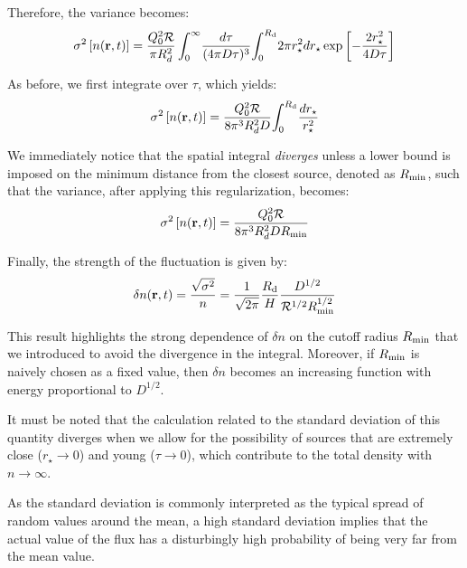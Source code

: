Therefore, the variance becomes:
%
\begin{equation}
\sigma^2 \left[ n(\vb r, t) \right] =
\frac{Q_0^2 \mathcal{R}}{\pi R_d^2} 
\int_0^{\infty} \! \frac{d\tau}{(4\pi D \tau)^{3}} \! \int_0^{R_{\rm d}} \! 2 \pi r_\star^2 dr_\star 
\exp \left[ -\frac{2  r_\star^2}{4 D \tau} \right] 
\end{equation}

As before, we first integrate over $\tau$, which yields:
%
\begin{equation}
\sigma^2 \left[ n(\vb r, t) \right] =
\frac{Q_0^2 \mathcal{R}}{8 \pi^3 R_d^2 D} 
\! \int_0^{R_{\rm d}} \! \frac{dr_\star}{r_\star^2}
\end{equation}

We immediately notice that the spatial integral \emph{diverges} unless a lower bound is imposed on the minimum distance from the closest source, denoted as $R_{\rm min}$, such that the variance, after applying this regularization, becomes:
%
\begin{equation}
\sigma^2 \left[ n(\vb r, t) \right] =
\frac{Q_0^2 \mathcal{R}}{8 \pi^3 R_d^2 D R_{\rm min}} 
\end{equation}

Finally, the strength of the fluctuation is given by:
%
\begin{equation}
\delta n (\vb r, t)  = \frac{\sqrt{\sigma^2}}{n} = \frac{1}{\sqrt{2\pi}} \frac{R_{\rm d}}{H} \frac{D^{1/2}}{\mathcal R^{1/2} R_{\rm min}^{1/2}}
\end{equation}

This result highlights the strong dependence of $\delta n$ on the cutoff radius $R_{\rm min}$ that we introduced to avoid the divergence in the integral. Moreover, if $R_{\rm min}$ is naively chosen as a fixed value, then $\delta n$ becomes an increasing function with energy proportional to $D^{1/2}$.

It must be noted that the calculation related to the standard deviation of this quantity diverges when we allow for the possibility of sources that are extremely close ($r_\star \rightarrow 0$) and young ($\tau \rightarrow 0$), which contribute to the total density with $n \rightarrow \infty$.

As the standard deviation is commonly interpreted as the typical spread of random values around the mean, a high standard deviation implies that the actual value of the flux has a disturbingly high probability of being very far from the mean value.

